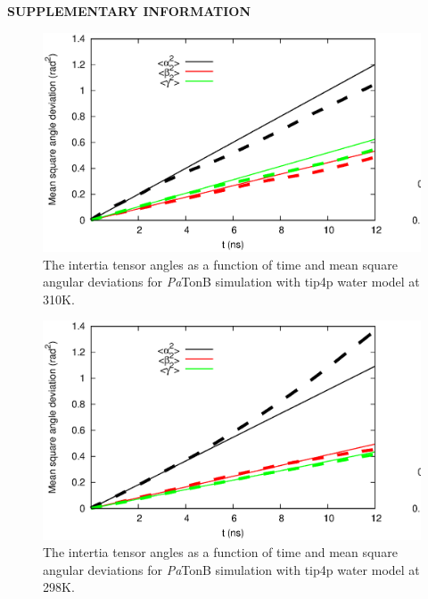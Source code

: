 \documentclass[pre,aps,floatfix,authordate1-4,twocolumn]{revtex4-1}
\begin{document}
\begin{center}
{\bf SUPPLEMENTARY INFORMATION}
\end{center}
\begin{figure}[!h]
  \includegraphics[width=16.5cm]{../Figs/RMASDplotPsTonBtip4pT310K.eps}%
  \caption{The intertia tensor angles as a function of time and mean square angular
    deviations for {\it Pa}TonB simulation with tip4p water model at 310K.
    \label{RMASDplotLOG310}}%
\end{figure}
\begin{figure}[!h]
  \includegraphics[width=16.5cm]{../Figs/RMASDplotPsTonBtip4pT298K.eps}%
  \caption{The intertia tensor angles as a function of time and mean square angular
    deviations for {\it Pa}TonB simulation with tip4p water model at 298K.
    \label{RMASDplotLOG298}}%
\end{figure}


\end{document}
